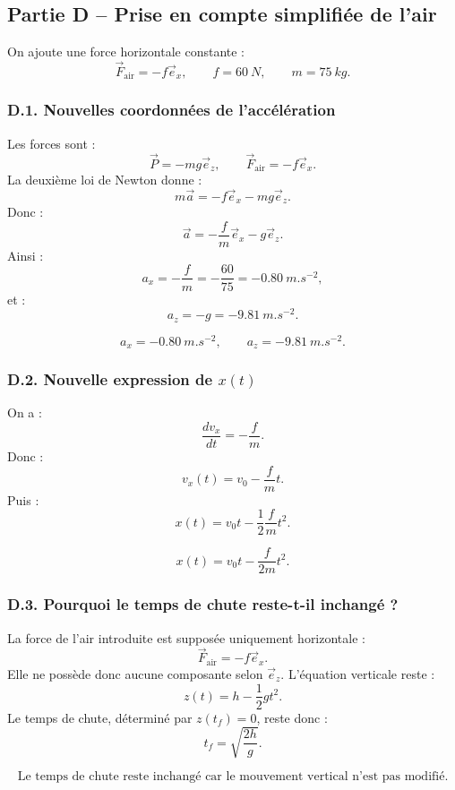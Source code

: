 \documentclass[11pt,a4paper]{article}
\begin{document}
\subsection{Partie D -- Prise en compte simplifiée de l'air}

On ajoute une force horizontale constante :
\[
\vec F_{\text{air}}=-f\vec e_x,
\qquad f=\SI{60}{N},
\qquad m=\SI{75}{kg}.
\]

\subsubsection*{D.1. Nouvelles coordonnées de l'accélération}

Les forces sont :
\[
\vec P=-mg\vec e_z,
\qquad
\vec F_{\text{air}}=-f\vec e_x.
\]
La deuxième loi de Newton donne :
\[
m\vec a=-f\vec e_x-mg\vec e_z.
\]
Donc :
\[
\vec a=-\frac{f}{m}\vec e_x-g\vec e_z.
\]
Ainsi :
\[
a_x=-\frac{f}{m}=-\frac{60}{75}=-0.80\ \si{m.s^{-2}},
\]
et :
\[
a_z=-g=-9.81\ \si{m.s^{-2}}.
\]

\begin{resultatbox}
\[
\boxed{a_x=-0.80\ \si{m.s^{-2}},\qquad a_z=-9.81\ \si{m.s^{-2}}.}
\]
\end{resultatbox}

\subsubsection*{D.2. Nouvelle expression de $x(t)$}

On a :
\[
\frac{dv_x}{dt}=-\frac{f}{m}.
\]
Donc :
\[
v_x(t)=v_0-\frac{f}{m}t.
\]
Puis :
\[
x(t)=v_0t-\frac12\frac{f}{m}t^2.
\]

\begin{resultatbox}
\[
\boxed{x(t)=v_0t-\frac{f}{2m}t^2.}
\]
\end{resultatbox}

\subsubsection*{D.3. Pourquoi le temps de chute reste-t-il inchangé ?}

La force de l'air introduite est supposée uniquement horizontale :
\[
\vec F_{\text{air}}=-f\vec e_x.
\]
Elle ne possède donc aucune composante selon $\vec e_z$. L'équation verticale reste :
\[
z(t)=h-\frac12gt^2.
\]
Le temps de chute, déterminé par $z(t_f)=0$, reste donc :
\[
t_f=\sqrt{\frac{2h}{g}}.
\]

\begin{resultatbox}
\[
\boxed{\text{Le temps de chute reste inchangé car le mouvement vertical n'est pas modifié.}}
\]
\end{resultatbox}
\end{document}
